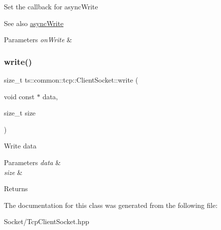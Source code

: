 Set the callback for async\+Write \begin{DoxySeeAlso}{See also}
\hyperlink{classts_1_1common_1_1tcp_1_1_client_socket_acab3419c27934c50c8020b255af1a3ee}{async\+Write} 
\end{DoxySeeAlso}

\begin{DoxyParams}{Parameters}
{\em on\+Write} & \\
\hline
\end{DoxyParams}
\mbox{\label{classts_1_1common_1_1tcp_1_1_client_socket_aa408490515485ebc5925685fa4cc4b93}} 
\subsubsection{\texorpdfstring{write()}{write()}}
{\footnotesize\ttfamily size\+\_\+t ts\+::common\+::tcp\+::\+Client\+Socket\+::write (\begin{DoxyParamCaption}\item[{void const $\ast$}]{data,  }\item[{size\+\_\+t}]{size }\end{DoxyParamCaption})}

Write data 
\begin{DoxyParams}{Parameters}
{\em data} & \\
\hline
{\em size} & \\
\hline
\end{DoxyParams}
\begin{DoxyReturn}{Returns}

\end{DoxyReturn}


The documentation for this class was generated from the following file\+:\begin{DoxyCompactItemize}
\item 
Socket/Tcp\+Client\+Socket.\+hpp\end{DoxyCompactItemize}
